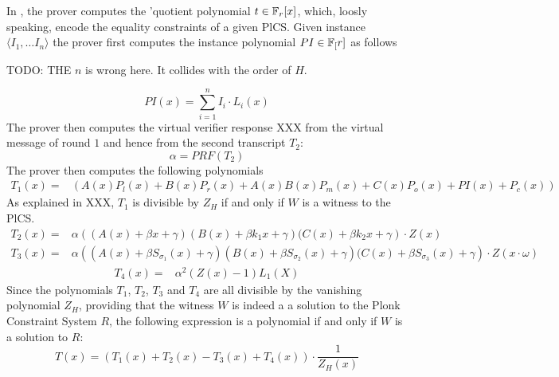 In , the prover computes the 'quotient polynomial $t\in \mathbb{F}_r[x]$, which, loosly speaking, encode the equality constraints of a given PlCS. Given instance $\langle I_1,\ldots I_n\rangle$ the prover first computes the instance polynomial $PI\in \mathbb{F}_[r]$ as follows

TODO: THE $n$ is wrong here. It collides with the order of $H$.

\begin{equation}
PI(x) = \textstyle \sum_{i=1}^n I_i\cdot L_i(x)
\end{equation}
The prover then computes the virtual verifier response XXX from the virtual message of round $1$ and hence from the second transcript $T_2$: 
\begin{equation}
\alpha=PRF(T_2)
\end{equation}
The prover then computes the following polynomials
\begin{equation}
\begin{array}{rl}
T_1(x) = & \left(A(x)P_l(x) + B(x)P_r(x) +A(x)B(x)P_m(x) + C(x)P_o(x) + PI(x) + P_c(x)\right)
\end{array}
\end{equation}
As explained in XXX, $T_1$ is divisible by $Z_H$ if and only if $W$ is a witness to the PlCS. 
\begin{equation}
\begin{array}{rl}
T_2(x) = & \alpha\left((A(x) + \beta x + \gamma)(B(x) + \beta k_1 x + \gamma)(C(x) + \beta k_2 x + \gamma\right)\cdot Z(x)
\end{array}
\end{equation}
\begin{equation}
\begin{array}{rl}
T_3(x) = & \alpha\left((A(x) + \beta S_{\sigma_1}(x) + \gamma)(B(x) + \beta S_{\sigma_2}(x) + \gamma)(C(x) + \beta S_{\sigma_3}(x) + \gamma\right)\cdot Z(x\cdot\omega) 
\end{array}
\end{equation}
\begin{equation}
\begin{array}{rl}
T_4(x) = &  \alpha^2(Z(x) - 1)L_1(X)
\end{array}
\end{equation}
Since the polynomials $T_1$, $T_2$, $T_3$ and $T_4$ are all divisible by the vanishing polynomial $Z_H$, providing that the witness $W$ is indeed a a solution to the Plonk Constraint System $R$, the following expression is a polynomial if and only if $W$ is a solution to $R$:
\begin{equation}
T(x) = \left( T_1(x) + T_2(x) - T_3(x) + T_4(x)\right)\cdot \frac{1}{Z_H(x)}
\end{equation}
